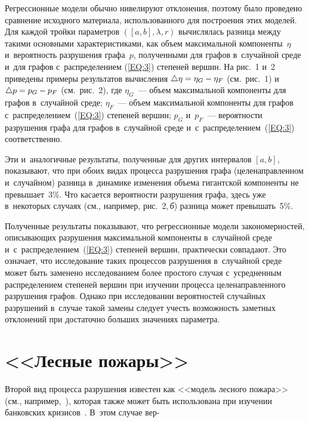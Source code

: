 \begin{multicols}{2}
Регрессионные модели обычно нивелируют отклонения, поэтому было проведено 
срав\-не\-ние\linebreak
исходного материала, использованного для по\-стро\-ения этих моделей. Для каждой тройки
па\-ра\-мет\-ров $([a,b],\lambda,r)$ вы\-чис\-ля\-лась раз\-ни\-ца между такими основными
характеристиками, как объем максимальной компоненты~$\eta$ и~ве\-ро\-ят\-ность
разрушения графа~$p$, полученными для графов в~случайной среде и~для графов 
с~распределением (\ref{EQ:3}) степеней вершин. На рис.~1 и~2 приведены примеры результатов
вы\-чис\-ле\-ния $\triangle\eta\hm=\eta_G\hm-\eta_F$ (см.\ рис.~1) 
и~$\triangle p\hm=p_G\hm-p_F$ (см.\ рис.~2),
где $\eta_G$~--- объем максимальной компоненты для графов в~случайной среде;
$\eta_F$~--- объем максимальной компоненты для графов с~распределением~(\ref{EQ:3}) 
степеней вершин; $p_G$ и~$p_F$~--- вероятности разрушения графа для графов
в~случайной среде и~с~рас\-пре\-де\-ле\-ни\-ем~(\ref{EQ:3}) соответственно.



Эти и~аналогичные результаты, полученные для других интервалов $[a,b]$, показывают,
что при обоих видах процесса разрушения графа (целенаправленном и~случайном) разница 
в~динамике изменения объема гигантской компоненты не превышает~3\%. Что касается вероятности
разрушения графа, здесь уже в~некоторых случаях (см., например, рис.~2,\,\textit{б}) разница может
превышать~5\%.


Полученные результаты показывают, что регрессионные модели закономерностей, 
опи\-сы\-ва\-ющих
разрушения максимальной компоненты в~случайной среде и~с~распределением~(\ref{EQ:3})
степеней вершин, практически совпадают. Это означает, что исследование таких процессов
разрушения в~случайной среде может быть заменено исследованием более прос\-то\-го случая 
с~усредненным распределением степеней вершин при изучении процесса целенаправленного
разрушения графов. Однако при исследовании вероятностей случайных разрушений в~случае
такой замены следует учесть воз\-мож\-ность заметных отклонений при достаточно больших
значениях па\-ра\-метра.

\vspace*{-9pt}

\section{<<Лесные пожары>>} %

Второй вид процесса разрушения известен как <<модель лесного пожара>> (см., 
например,~\cite{Dros,Ber}), которая так\-же может быть использована при изуче\-нии банковских 
кризисов~\cite{Ari}.  В~этом случае вер-\linebreak\vspace*{-12pt}



\pagebreak

\end{multicols}

